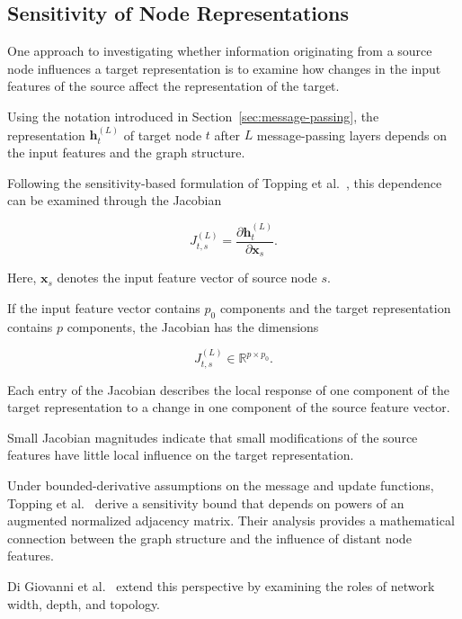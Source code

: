 \documentclass[english]{lni}
\begin{document}
\subsection{Sensitivity of Node Representations}
\label{sec:oversquashing-sensitivity}

One approach to investigating whether information originating
from a source node influences a target representation is to
examine how changes in the input features of the source affect
the representation of the target.

Using the notation introduced in
Section~\ref{sec:message-passing}, the representation
$\mathbf{h}_t^{(L)}$ of target node $t$ after $L$
message-passing layers depends on the input features and the
graph structure.

Following the sensitivity-based formulation of
Topping et al.\ \cite{topping2022oversquashing}, this
dependence can be examined through the Jacobian

\begin{equation}
    J_{t,s}^{(L)}
    =
    \frac{\partial \mathbf{h}_t^{(L)}}
         {\partial \mathbf{x}_s}.
    \label{eq:oversquashing-jacobian}
\end{equation}

Here, $\mathbf{x}_s$ denotes the input feature vector of
source node $s$.

If the input feature vector contains $p_0$ components and
the target representation contains $p$ components, the
Jacobian has the dimensions

\[
    J_{t,s}^{(L)}
    \in \mathbb{R}^{p\times p_0}.
\]

Each entry of the Jacobian describes the local response of
one component of the target representation to a change in
one component of the source feature vector.

Small Jacobian magnitudes indicate that small modifications
of the source features have little local influence on the
target representation.

Under bounded-derivative assumptions on the message and
update functions, Topping et al.\
\cite{topping2022oversquashing} derive a sensitivity bound
that depends on powers of an augmented normalized adjacency
matrix. Their analysis provides a mathematical connection
between the graph structure and the influence of distant
node features.

Di Giovanni et al.\ \cite{digiovanni2023oversquashing}
extend this perspective by examining the roles of network
width, depth, and topology.
\end{document}
